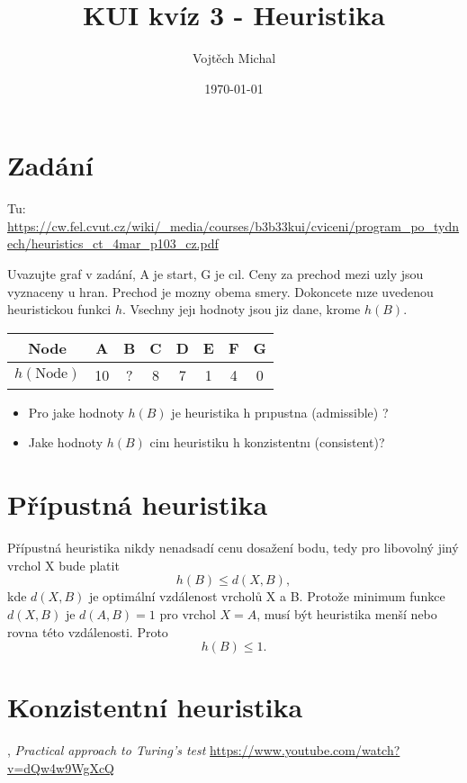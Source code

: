 \documentclass[twoside]{article}
\title{KUI kvíz 3 - Heuristika}
\author{Vojtěch Michal}
\date{\today}
\begin{document}
\maketitle


\section{Zadání}
Tu: \url{https://cw.fel.cvut.cz/wiki/_media/courses/b3b33kui/cviceni/program_po_tydnech/heuristics_ct_4mar_p103_cz.pdf}

Uvazujte graf v zadání, A je start, G je cıl. Ceny za prechod mezi uzly jsou vyznaceny u hran. Prechod
je mozny obema smery.
Dokoncete nıze uvedenou heuristickou funkci $h$. Vsechny jejı hodnoty jsou jiz dane, krome $h(B)$.

\begin{table}
	\centering
	\begin{tabular}{c|c|c|c|c|c|c|c|}
		Node & A & B & C & D & E & F & G \\ 
		\hline
		$h(\text{Node})$ & 10 & ? & 8 & 7 & 1 & 4 & 0
	\end{tabular}
\end{table}

\begin{itemize}
	\item Pro jake hodnoty $h(B)$ je heuristika h prıpustna (admissible) ?
	\item Jake hodnoty $h(B)$ cinı heuristiku h konzistentnı (consistent)?
\end{itemize}

\section{Přípustná heuristika}

Přípustná heuristika nikdy nenadsadí cenu dosažení bodu, tedy pro libovolný jiný vrchol X bude platit
\begin{equation*}
	h(B) \le d(X, B),
\end{equation*}
kde $d(X, B)$ je optimální vzdálenost vrcholů X a B. Protože minimum funkce $d(X, B)$ je $d(A, B) = 1$ pro vrchol $X = A$,
musí být heuristika menší nebo rovna této vzdálenosti. Proto
\begin{equation*}
	h(B) \le 1.
\end{equation*}

\section{Konzistentní heuristika}

\begin{thebibliography}{9}

	, \emph{Practical approach to Turing's test} \url{https://www.youtube.com/watch?v=dQw4w9WgXcQ}
\end{thebibliography}
\end{document}
